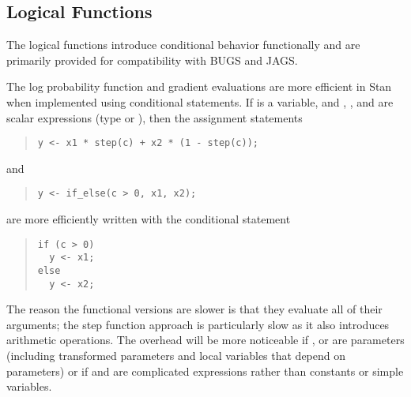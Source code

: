 \subsection{Logical Functions}

The logical functions introduce conditional behavior functionally and
are primarily provided for compatibility with BUGS and JAGS.
%
\begin{description}
%
%
%
\end{description}

The log probability function and gradient evaluations are more
efficient in Stan when implemented using conditional statements.  If
 is a  variable, and , , and
 are scalar expressions (type  or ),
then the assignment statements
%
\begin{quote}
\begin{Verbatim}
y <- x1 * step(c) + x2 * (1 - step(c));
\end{Verbatim}
\end{quote}
%
and
%
\begin{quote}
\begin{Verbatim}
y <- if_else(c > 0, x1, x2);
\end{Verbatim}
\end{quote}
%
are more efficiently written with the conditional statement
%
\begin{quote}
\begin{Verbatim}
if (c > 0)
  y <- x1;
else
  y <- x2;
\end{Verbatim}
\end{quote}
%
The reason the functional versions are slower is that they evaluate
all of their arguments; the step function approach is particularly
slow as it also introduces arithmetic operations.  The overhead will
be more noticeable if ,  or 
are parameters (including transformed parameters and local variables
that depend on parameters) or if  and  are
complicated expressions rather than constants or simple variables.  

